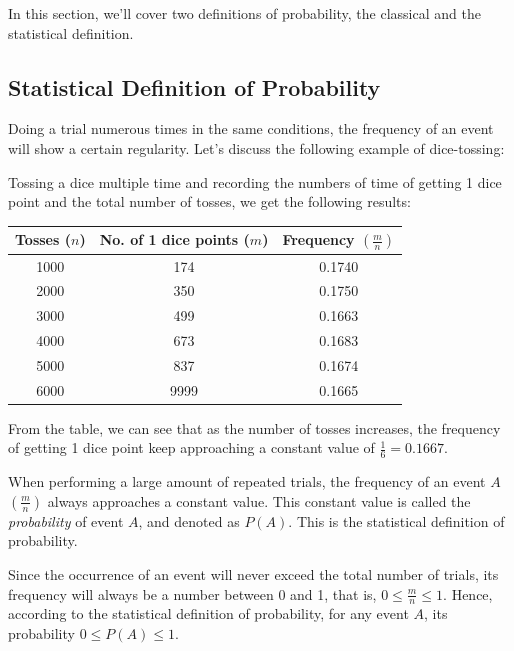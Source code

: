 \documentclass{report}
\begin{document}
\begin{multicols}{2}
  In this section, we'll cover two definitions of probability, the classical and
  the statistical definition.

  \subsection*{Statistical Definition of Probability}

  Doing a trial numerous times in the same conditions, the frequency of an event
  will show a certain regularity. Let's discuss the following example of
  dice-tossing:

  Tossing a dice multiple time and recording the numbers of time of getting 1
  dice point and the total number of tosses, we get the following results:

  \begin{center}
    \begin{tabular}{|c|c|c|}
      \hline
      Tosses ($n$) & No. of 1 dice points ($m$) & Frequency $\left(\frac{m}{n}\right)$ \\
      \hline
      1000         & 174                        & 0.1740                               \\
      2000         & 350                        & 0.1750                               \\
      3000         & 499                        & 0.1663                               \\
      4000         & 673                        & 0.1683                               \\
      5000         & 837                        & 0.1674                               \\
      6000         & 9999                       & 0.1665                               \\
      \hline
    \end{tabular}
  \end{center}

  From the table, we can see that as the number of tosses increases, the
  frequency of getting 1 dice point keep approaching a constant value of
  $\frac{1}{6} = 0.1667$.

  When performing a large amount of repeated trials, the frequency of an event
  $A$ $\left(\frac{m}{n}\right)$ always approaches a constant value. This
  constant value is called the \emph{probability} of event $A$, and denoted as
  $P(A)$. This is the statistical definition of probability.

  Since the occurrence of an event will never exceed the total number of trials,
  its frequency will always be a number between 0 and 1, that is, $0 \leq
    \frac{m}{n} \leq 1$. Hence, according to the statistical definition of
  probability, for any event $A$, its probability $0 \leq P(A) \leq 1$.


\end{multicols}
\end{document}
